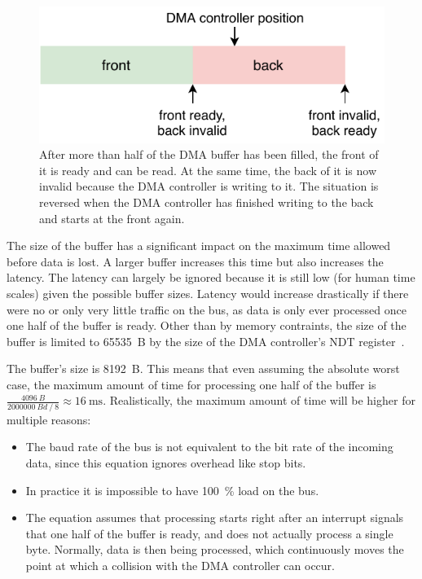 \begin{figure}[h]
    \centering
    \includegraphics[scale=1.0]{img/dma_buffer.pdf}
    \caption[Layout of the DMA buffer]{
        After more than half of the DMA buffer has been filled, the front of it is ready and can be
        read. At the same time, the back of it is now invalid because the DMA controller is writing
        to it. The situation is reversed when the DMA controller has finished writing to the back
        and starts at the front again.
    }
\end{figure}

The size of the buffer has a significant impact on the maximum time allowed before data is lost. A
larger buffer increases this time but also increases the latency. The latency can largely be ignored
because it is still low (for human time scales) given the possible buffer sizes. Latency would
increase drastically if there were no or only very little traffic on the bus, as data is only ever
processed once one half of the buffer is ready. Other than by memory contraints, the size of the buffer
is limited to \SI{65535}{B} by the size of the DMA controller's NDT register~\cite{mcu-ref-manual}.

The buffer's size is \SI{8192}{B}. This means that even assuming the absolute worst case, the maximum
amount of time for processing one half of the buffer is
$\frac{\SI{4096}{B}}{\SI{2000000}{Bd} \mathbin{/} 8} \approx \SI{16}{\milli\second}$. Realistically,
the maximum amount of time will be higher for multiple reasons:

\begin{itemize}
    \item The baud rate of the bus is not equivalent to the bit rate of the incoming data, since
          this equation ignores overhead like stop bits.
    \item In practice it is impossible to have \SI{100}{\percent} load on the bus.
    \item The equation assumes that processing starts right after an interrupt signals that one half
          of the buffer is ready, and does not actually process a single byte. Normally, data is
          then being processed, which continuously moves the point at which a collision with the DMA
          controller can occur.
\end{itemize}

